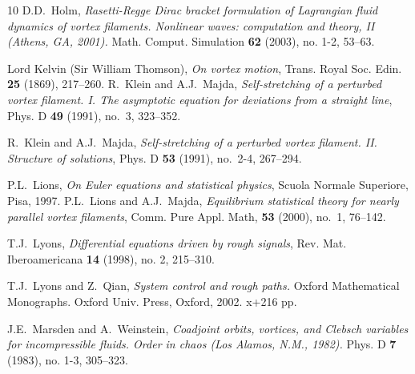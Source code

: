 \documentclass[a4paper,11pt]{article}
\numberwithin{equation}{section}
\begin{document}
\begin{thebibliography}{10}
D.D.~Holm, \emph{Rasetti-Regge Dirac bracket formulation of Lagrangian
fluid dynamics of vortex filaments. Nonlinear waves: computation and
theory, II (Athens, GA, 2001).}  Math. Comput. Simulation \textbf{62}
(2003), no. 1-2, 53--63.
%
%
%

Lord Kelvin (Sir William Thomson), \emph{On vortex motion},
Trans. Royal Soc. Edin. \textbf{25} (1869), 217--260.
%
R.~Klein and A.J.~Majda, \emph{Self-stretching of a perturbed vortex
  filament. {I}. {T}he asymptotic equation for deviations from a
  straight line}, Phys. D \textbf{49} (1991), no.~3, 323--352.

R.~Klein and A.J.~Majda, \emph{Self-stretching of a perturbed vortex
  filament. {I}{I}. {S}tructure of solutions}, Phys. D \textbf{53}
  (1991), no.~2-4, 267--294.
%
%
%

P.L.~Lions, \emph{On Euler equations and statistical physics}, Scuola
Normale Superiore, Pisa, 1997.
%
P.L.~Lions and A.J.~Majda, \emph{Equilibrium statistical theory for
  nearly parallel vortex filaments}, Comm. Pure Appl. Math,
\textbf{53} (2000), no.~1, 76--142. 

T.J.~Lyons, \emph{Differential equations driven by rough signals},
Rev. Mat. Iberoamericana \textbf{14} (1998), no. 2, 215--310. 

T.J.~Lyons and Z.~Qian, \emph{System control and rough paths.} Oxford
  Mathematical Monographs. Oxford Univ. Press, Oxford, 2002. x+216 pp.  

%
%

J.E.~Marsden and A.~Weinstein, \emph{Coadjoint orbits, vortices, and
  Clebsch variables for incompressible fluids. Order in chaos (Los
  Alamos, N.M., 1982).}  Phys. D  \textbf{7}  (1983),  no. 1-3,
305--323.   



\end{thebibliography}
\end{document}
